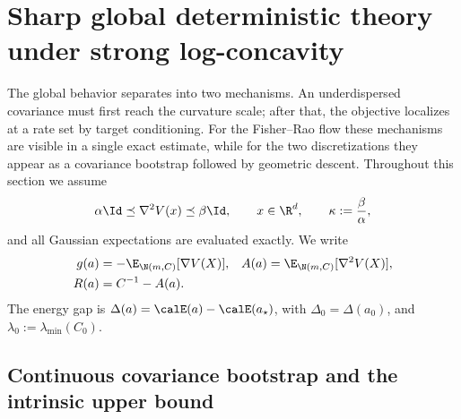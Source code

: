 \section{Sharp global deterministic theory under strong log-concavity}
\label{sec:global}

The global behavior separates into two mechanisms.  An underdispersed covariance must first reach
the curvature scale; after that, the objective localizes at a rate set by target conditioning.  For
the Fisher--Rao flow these mechanisms are visible in a single exact estimate, while for the two
discretizations they appear as a covariance bootstrap followed by geometric descent.  Throughout
this section we assume
\begin{equation}
\label{eq:global:curvature-assumption}
    \alpha\Id\preceq \nabla^2V(x)\preceq\beta\Id,
    \qquad x\in\R^d,
    \qquad
    \kappa:=\frac{\beta}{\alpha},
\end{equation}
and all Gaussian expectations are evaluated exactly.  We write
\begin{equation}
\label{eq:global:averaged-derivatives}
    \begin{aligned}
        g(a)&=-\E_{\N(m,C)}[\nabla V(X)],
        &
        A(a)&=\E_{\N(m,C)}[\nabla^2V(X)],\\
        R(a)&=C^{-1}-A(a).
    \end{aligned}
\end{equation}
The energy gap is
\(
\Delta(a)=\calE(a)-\calE(a_\star)
\), with \(\Delta_0=\Delta(a_0)\), and
\(\lambda_0:=\lambda_{\min}(C_0)\).

\subsection{Continuous covariance bootstrap and the intrinsic upper bound}
\label{sec:global:continuous}


